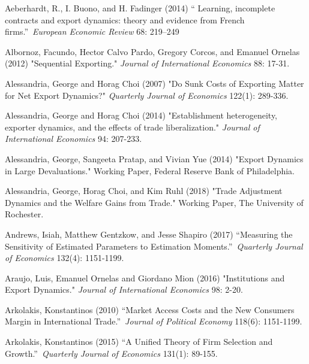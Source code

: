 \documentclass[12pt]{article}
\begin{document}
\begin{description}
\item Aeberhardt, R., I. Buono, and H. Fadinger (2014) \textquotedblleft
Learning, incomplete contracts and export dynamics: theory and evidence from
French firms.\textquotedblright\ \textit{European Economic Review} 68:
219--249

\item Albornoz, Facundo, Hector Calvo Pardo, Gregory Corcos, and Emanuel
Ornelas (2012) "Sequential Exporting." \textit{Journal of International
Economics} 88: 17-31.

\item Alessandria, George and Horag Choi (2007) "Do Sunk Costs of Exporting
Matter for Net Export Dynamics?" \textit{Quarterly Journal of Economics} 122(1):
289-336.

\item Alessandria, George and Horag Choi (2014) "Establishment
heterogeneity, exporter dynamics, and the effects of trade liberalization." 
\textit{Journal of International Economics} 94: 207-233.

\item Alessandria, George, Sangeeta Pratap, and Vivian Yue (2014) "Export
Dynamics in Large Devaluations." Working Paper, Federal Reserve Bank of
Philadelphia.

\item Alessandria, George, Horag Choi, and Kim Ruhl (2018) "Trade Adjustment
Dynamics and the Welfare Gains from Trade." Working Paper, The University of
Rochester.

\item Andrews, Isiah, Matthew Gentzkow, and Jesse Shapiro  (2017) \textquotedblleft Measuring the Sensitivity of Estimated Parameters to Estimation Moments.\textquotedblright\ 
\textit{Quarterly Journal of Economics} 132(4): 1151-1199.

\item Araujo, Luis, Emanuel Ornelas and Giordano Mion (2016) "Institutions
and Export Dynamics." \textit{Journal of International Economics }98: 2-20.

\item Arkolakis, Konstantinos (2010) \textquotedblleft Market Access Costs
and the New Consumers Margin in International Trade.\textquotedblright\ 
\textit{Journal of Political Economy} 118(6): 1151-1199.

\item Arkolakis, Konstantinos (2015) \textquotedblleft A Unified Theory of
Firm Selection and Growth.\textquotedblright\ \textit{Quarterly Journal of
Economics} 131(1): 89-155.


\end{description}
\end{document}
